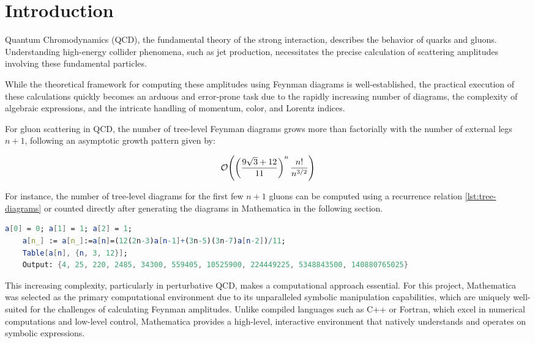 \documentclass[main.tex]{subfiles}
\begin{document}
\section{Introduction}
\setcounter{page}{1}

Quantum Chromodynamics (QCD), the fundamental theory of the strong interaction, describes the behavior of quarks and gluons. 
Understanding high-energy collider phenomena, such as jet production, necessitates the precise calculation of scattering amplitudes 
involving these fundamental particles. 

While the theoretical framework for computing these amplitudes using Feynman diagrams is well-established, 
the practical execution of these calculations quickly becomes an arduous and error-prone task due to the rapidly increasing number of diagrams, 
the complexity of algebraic expressions, and the intricate handling of momentum, color, and Lorentz indices.

For gluon scattering in QCD, the number of tree-level Feynman diagrams grows more than factorially with the number of external legs $n+1$, 
following an asymptotic growth pattern given by:

\begin{equation}
    \order{\left(\frac{9 \sqrt{3}+12}{11} \right)^n \frac{n!}{n^{3/2}}}   
\end{equation}

For instance, the number of tree-level diagrams for the first few $n+1$ gluons can be computed using a recurrence relation \cref{lst:tree-diagrams} 
or counted directly after generating the diagrams in Mathematica in the following section.

\begin{lstlisting}[language=Mathematica,caption = {Number of tree-level diagrams for $n+1$ gluons}, label = {lst:tree-diagrams}]
    a[0] = 0; a[1] = 1; a[2] = 1;
    a[n_] := a[n_]:=a[n]=(12(2n-3)a[n-1]+(3n-5)(3n-7)a[n-2])/11;
    Table[a[n], {n, 3, 12}];
    Output: {4, 25, 220, 2485, 34300, 559405, 10525900, 224449225, 5348843500, 140880765025}
\end{lstlisting}

This increasing complexity, particularly in perturbative QCD, makes a computational approach essential.
For this project, Mathematica \cite{Mathematica} was selected as the primary computational environment due to its unparalleled symbolic manipulation capabilities, which are uniquely well-suited 
for the challenges of calculating Feynman amplitudes. Unlike compiled languages such as C++ or Fortran, which excel in numerical computations and low-level 
control, Mathematica provides a high-level, interactive environment that natively understands and operates on symbolic expressions.
\end{document}
